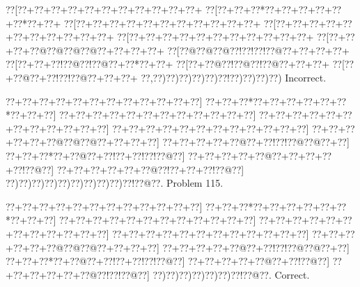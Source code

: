 \documentclass[a5paper]{article}
\begin{document}
\begin{center}
{\goo
\0??[\0??+\0??+\0??+\0??+\0??+\0??+\0??+\0??+\0??+\0??+\0??+
\0??[\0??+\0??+\0??*\0??+\0??+\0??+\0??+\0??+\0??*\0??+\0??+
\0??[\0??+\0??+\0??+\0??+\0??+\0??+\0??+\0??+\0??+\0??+\0??+
\0??[\0??+\0??+\0??+\0??+\0??+\0??+\0??+\0??+\0??+\0??+\0??+
\0??[\0??+\0??+\0??+\0??+\0??+\0??+\0??+\0??+\0??+\0??+\0??+
\0??[\0??+\0??+\0??+\0??@\0??@\0??@\0??@\0??+\0??+\0??+\0??+
\0??[\0??@\0??@\0??@\0??!\0??!\0??!\0??@\0??+\0??+\0??+\0??+
\0??[\0??+\0??+\0??!\0??@\0??!\0??@\0??+\0??*\0??+\0??+
\0??[\0??+\0??@\0??!\0??@\0??!\0??@\0??+\0??+\0??+
\0??[\0??+\0??@\0??+\0??!\0??!\0??@\0??+\0??+\0??+
\0??,\0??)\0??)\0??)\0??)\0??)\0??!\0??)\0??)\0??)\0??)
}
Incorrect. 

\end{center}
\newpage
\begin{center}
{\goo
\0??+\0??+\0??+\0??+\0??+\0??+\0??+\0??+\0??+\0??+\0??+\0??]
\0??+\0??+\0??*\0??+\0??+\0??+\0??+\0??+\0??*\0??+\0??+\0??]
\0??+\0??+\0??+\0??+\0??+\0??+\0??+\0??+\0??+\0??+\0??+\0??]
\0??+\0??+\0??+\0??+\0??+\0??+\0??+\0??+\0??+\0??+\0??+\0??]
\0??+\0??+\0??+\0??+\0??+\0??+\0??+\0??+\0??+\0??+\0??+\0??]
\0??+\0??+\0??+\0??+\0??+\0??@\0??@\0??@\0??+\0??+\0??+\0??]
\0??+\0??+\0??+\0??+\0??@\0??+\0??!\0??!\0??@\0??@\0??+\0??]
\0??+\0??+\0??*\0??+\0??@\0??+\0??!\0??+\0??!\0??!\0??@\0??]
\0??+\0??+\0??+\0??+\0??@\0??+\0??+\0??+\0??+\0??!\0??@\0??]
\0??+\0??+\0??+\0??+\0??+\0??@\0??!\0??+\0??+\0??!\0??@\0??]
\0??)\0??)\0??)\0??)\0??)\0??)\0??)\0??)\0??)\0??!\0??@\0??.
}
Problem 115.

\end{center}
\begin{center}
{\goo
\0??+\0??+\0??+\0??+\0??+\0??+\0??+\0??+\0??+\0??+\0??+\0??]
\0??+\0??+\0??*\0??+\0??+\0??+\0??+\0??+\0??*\0??+\0??+\0??]
\0??+\0??+\0??+\0??+\0??+\0??+\0??+\0??+\0??+\0??+\0??+\0??]
\0??+\0??+\0??+\0??+\0??+\0??+\0??+\0??+\0??+\0??+\0??+\0??]
\0??+\0??+\0??+\0??+\0??+\0??+\0??+\0??+\0??+\0??+\0??+\0??]
\0??+\0??+\0??+\0??+\0??+\0??@\0??@\0??@\0??+\0??+\0??+\0??]
\0??+\0??+\0??+\0??+\0??@\0??+\0??!\0??!\0??@\0??@\0??+\0??]
\0??+\0??+\0??*\0??+\0??@\0??+\0??!\0??+\0??!\0??!\0??@\0??]
\0??+\0??+\0??+\0??+\0??@\0??+\0??!\0??@\0??]
\0??+\0??+\0??+\0??+\0??+\0??@\0??!\0??!\0??@\0??]
\0??)\0??)\0??)\0??)\0??)\0??)\0??!\0??@\0??.
}
Correct. 

\end{center}
\end{document}
